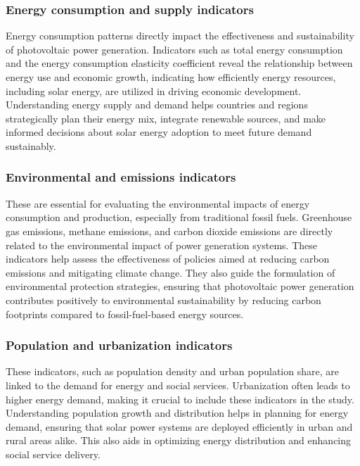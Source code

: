 \documentclass{article}
\begin{document}
	\subsubsection{Energy consumption and supply indicators}
	Energy consumption patterns directly impact the effectiveness and sustainability of photovoltaic power generation. Indicators such as total energy consumption and the energy consumption elasticity coefficient reveal the relationship between energy use and economic growth, indicating how efficiently energy resources, including solar energy, are utilized in driving economic development. Understanding energy supply and demand helps countries and regions strategically plan their energy mix, integrate renewable sources, and make informed decisions about solar energy adoption to meet future demand sustainably.
	
	\subsubsection{Environmental and emissions indicators}
	These are essential for evaluating the environmental impacts of energy consumption and production, especially from traditional fossil fuels. Greenhouse gas emissions, methane emissions, and carbon dioxide emissions are directly related to the environmental impact of power generation systems. These indicators help assess the effectiveness of policies aimed at reducing carbon emissions and mitigating climate change. They also guide the formulation of environmental protection strategies, ensuring that photovoltaic power generation contributes positively to environmental sustainability by reducing carbon footprints compared to fossil-fuel-based energy sources.
	
	\subsubsection{Population and urbanization indicators}
	These indicators, such as population density and urban population share, are linked to the demand for energy and social services. Urbanization often leads to higher energy demand, making it crucial to include these indicators in the study. Understanding population growth and distribution helps in planning for energy demand, ensuring that solar power systems are deployed efficiently in urban and rural areas alike. This also aids in optimizing energy distribution and enhancing social service delivery.
	
\end{document}
